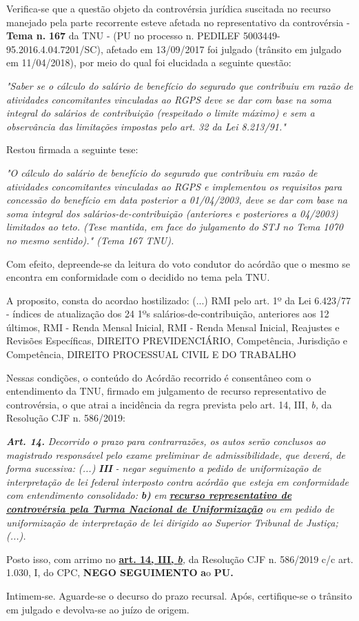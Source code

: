 \documentclass[12pt]{article}
\begin{document}
\justifying
\noindent Verifica-se que a questão objeto da controvérsia jurídica suscitada no recurso manejado pela parte recorrente esteve afetada no representativo da controvérsia - \textbf{Tema n. }\textbf{167} da TNU - (PU no processo n. PEDILEF 5003449-95.2016.4.04.7201/SC),  afetado em 13/09/2017 foi julgado (trânsito em julgado em 11/04/2018), por meio do qual foi elucidada a seguinte questão:

\noindent \textit{"Saber se o cálculo do salário de benefício do segurado que contribuiu em razão de atividades concomitantes vinculadas ao RGPS deve se dar com base na soma integral do salários de contribuição (respeitado o limite máximo) e sem a observância das limitações impostas pelo art. 32 da Lei 8.213/91."}

\noindent Restou firmada a seguinte tese:

\noindent \textit{"O cálculo do salário de benefício do segurado que contribuiu em razão de atividades concomitantes vinculadas ao RGPS e implementou os requisitos para concessão do benefício em data posterior a 01/04/2003, deve se dar com base na soma integral dos salários-de-contribuição (anteriores e posteriores a 04/2003) limitados ao teto. (Tese mantida, em face do julgamento do STJ no Tema 1070 no mesmo sentido)." (Tema 167 TNU).}

\noindent Com efeito, depreende-se da leitura do voto condutor do acórdão que o mesmo se encontra em conformidade com o decidido no  tema pela TNU.

\noindent A proposito, consta do acordao hostilizado: (...) RMI pelo art. 1º da Lei 6.423/77 - índices de atualização dos 24 1ºs salários-de-contribuição, anteriores aos 12 últimos, RMI - Renda Mensal Inicial, RMI - Renda Mensal Inicial, Reajustes e Revisões Específicas, DIREITO PREVIDENCIÁRIO, Competência, Jurisdição e Competência, DIREITO PROCESSUAL CIVIL E DO TRABALHO

\noindent Nessas condições, o conteúdo do Acórdão recorrido é consentâneo com o entendimento da TNU, firmado em julgamento de recurso representativo de controvérsia, o que atrai a incidência da regra prevista pelo art. 14, III, \textit{b,} da Resolução CJF n. 586/2019:

\noindent \textit{\textbf{Art. 14.}}\textit{ Decorrido o prazo para contrarrazões, os autos serão conclusos ao magistrado responsável pelo exame preliminar de admissibilidade, que deverá, de forma sucessiva: (...) }\textit{\textbf{III }}\textit{- negar seguimento a pedido de uniformização de interpretação de lei federal interposto contra acórdão que esteja em conformidade com entendimento consolidado: }\textit{\textbf{b)}}\textit{ em }\uline{\textit{\textbf{recurso representativo de controvérsia pela Turma Nacional de Uniformização}}}\textit{ ou em pedido de uniformização de interpretação de lei dirigido ao Superior Tribunal de Justiça;(...).}

\noindent Posto isso, com arrimo no \uline{\textbf{art. 14, III, }}\uline{\textit{\textbf{b}}}\textit{,} da Resolução CJF n. 586/2019 c/c art. 1.030, I, do CPC, \textbf{NEGO SEGUIMENTO }\textbf{a}o\textbf{ PU}\textbf{.}

\noindent Intimem-se. Aguarde-se o decurso do prazo recursal. Após, certifique-se o trânsito em julgado e devolva-se ao juízo de origem.
\end{document}
